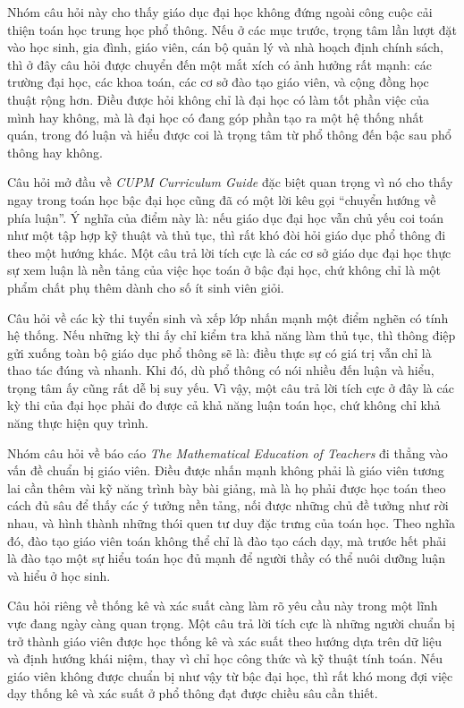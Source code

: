 \documentclass[
  10pt,
  a4paper,
  landscape,
  twoside,
  openany
]{scrbook}
\newcommand{\NOTE}[1]{#1}
\begin{document}
{
\NOTE{Nhóm câu hỏi này cho thấy giáo dục đại học không đứng ngoài công cuộc cải thiện toán học trung học phổ thông. Nếu ở các mục trước, trọng tâm lần lượt đặt vào học sinh, gia đình, giáo viên, cán bộ quản lý và nhà hoạch định chính sách, thì ở đây câu hỏi được chuyển đến một mắt xích có ảnh hưởng rất mạnh: các trường đại học, các khoa toán, các cơ sở đào tạo giáo viên, và cộng đồng học thuật rộng hơn. Điều được hỏi không chỉ là đại học có làm tốt phần việc của mình hay không, mà là đại học có đang góp phần tạo ra một hệ thống nhất quán, trong đó luận và hiểu được coi là trọng tâm từ phổ thông đến bậc sau phổ thông hay không.

Câu hỏi mở đầu về \emph{CUPM Curriculum Guide} đặc biệt quan trọng vì nó cho thấy ngay trong toán học bậc đại học cũng đã có một lời kêu gọi “chuyển hướng về phía luận”. Ý nghĩa của điểm này là: nếu giáo dục đại học vẫn chủ yếu coi toán như một tập hợp kỹ thuật và thủ tục, thì rất khó đòi hỏi giáo dục phổ thông đi theo một hướng khác. Một câu trả lời tích cực là các cơ sở giáo dục đại học thực sự xem luận là nền tảng của việc học toán ở bậc đại học, chứ không chỉ là một phẩm chất phụ thêm dành cho số ít sinh viên giỏi.

Câu hỏi về các kỳ thi tuyển sinh và xếp lớp nhấn mạnh một điểm nghẽn có tính hệ thống. Nếu những kỳ thi ấy chỉ kiểm tra khả năng làm thủ tục, thì thông điệp gửi xuống toàn bộ giáo dục phổ thông sẽ là: điều thực sự có giá trị vẫn chỉ là thao tác đúng và nhanh. Khi đó, dù phổ thông có nói nhiều đến luận và hiểu, trọng tâm ấy cũng rất dễ bị suy yếu. Vì vậy, một câu trả lời tích cực ở đây là các kỳ thi của đại học phải đo được cả khả năng luận toán học, chứ không chỉ khả năng thực hiện quy trình.

Nhóm câu hỏi về báo cáo \emph{The Mathematical Education of Teachers} đi thẳng vào vấn đề chuẩn bị giáo viên. Điều được nhấn mạnh không phải là giáo viên tương lai cần thêm vài kỹ năng trình bày bài giảng, mà là họ phải được học toán theo cách đủ sâu để thấy các ý tưởng nền tảng, nối được những chủ đề tưởng như rời nhau, và hình thành những thói quen tư duy đặc trưng của toán học. Theo nghĩa đó, đào tạo giáo viên toán không thể chỉ là đào tạo cách dạy, mà trước hết phải là đào tạo một sự hiểu toán học đủ mạnh để người thầy có thể nuôi dưỡng luận và hiểu ở học sinh.

Câu hỏi riêng về thống kê và xác suất càng làm rõ yêu cầu này trong một lĩnh vực đang ngày càng quan trọng. Một câu trả lời tích cực là những người chuẩn bị trở thành giáo viên được học thống kê và xác suất theo hướng dựa trên dữ liệu và định hướng khái niệm, thay vì chỉ học công thức và kỹ thuật tính toán. Nếu giáo viên không được chuẩn bị như vậy từ bậc đại học, thì rất khó mong đợi việc dạy thống kê và xác suất ở phổ thông đạt được chiều sâu cần thiết.

}}
\end{document}
